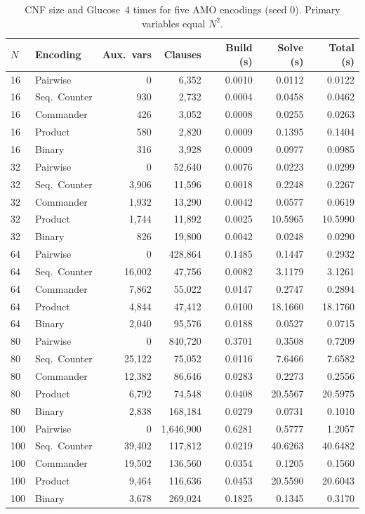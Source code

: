 \documentclass[a4paper,fleqn]{cas-sc}
\begin{document}
\begin{table}[t]
\centering
\caption{CNF size and Glucose~4 times for five AMO encodings (seed 0). Primary variables equal $N^2$.}
\label{tab:enc_data}
\begin{tabular*}{\textwidth}{@{\extracolsep{\fill}}llrrrrr@{}}
\toprule
$N$ & Encoding & Aux.\ vars & Clauses & Build (s) & Solve (s) & Total (s) \\
\midrule
16 & Pairwise & 0 & 6{,}352 & 0.0010 & 0.0112 & 0.0122 \\
16 & Seq.\ Counter & 930 & 2{,}732 & 0.0004 & 0.0458 & 0.0462 \\
16 & Commander & 426 & 3{,}052 & 0.0008 & 0.0255 & 0.0263 \\
16 & Product & 580 & 2{,}820 & 0.0009 & 0.1395 & 0.1404 \\
16 & Binary & 316 & 3{,}928 & 0.0009 & 0.0977 & 0.0985 \\
\midrule
32 & Pairwise & 0 & 52{,}640 & 0.0076 & 0.0223 & 0.0299 \\
32 & Seq.\ Counter & 3{,}906 & 11{,}596 & 0.0018 & 0.2248 & 0.2267 \\
32 & Commander & 1{,}932 & 13{,}290 & 0.0042 & 0.0577 & 0.0619 \\
32 & Product & 1{,}744 & 11{,}892 & 0.0025 & 10.5965 & 10.5990 \\
32 & Binary & 826 & 19{,}800 & 0.0042 & 0.0248 & 0.0290 \\
\midrule
64 & Pairwise & 0 & 428{,}864 & 0.1485 & 0.1447 & 0.2932 \\
64 & Seq.\ Counter & 16{,}002 & 47{,}756 & 0.0082 & 3.1179 & 3.1261 \\
64 & Commander & 7{,}862 & 55{,}022 & 0.0147 & 0.2747 & 0.2894 \\
64 & Product & 4{,}844 & 47{,}412 & 0.0100 & 18.1660 & 18.1760 \\
64 & Binary & 2{,}040 & 95{,}576 & 0.0188 & 0.0527 & 0.0715 \\
\midrule
80 & Pairwise & 0 & 840{,}720 & 0.3701 & 0.3508 & 0.7209 \\
80 & Seq.\ Counter & 25{,}122 & 75{,}052 & 0.0116 & 7.6466 & 7.6582 \\
80 & Commander & 12{,}382 & 86{,}646 & 0.0283 & 0.2273 & 0.2556 \\
80 & Product & 6{,}792 & 74{,}548 & 0.0408 & 20.5567 & 20.5975 \\
80 & Binary & 2{,}838 & 168{,}184 & 0.0279 & 0.0731 & 0.1010 \\
\midrule
100 & Pairwise & 0 & 1{,}646{,}900 & 0.6281 & 0.5777 & 1.2057 \\
100 & Seq.\ Counter & 39{,}402 & 117{,}812 & 0.0219 & 40.6263 & 40.6482 \\
100 & Commander & 19{,}502 & 136{,}560 & 0.0354 & 0.1205 & 0.1560 \\
100 & Product & 9{,}464 & 116{,}636 & 0.0453 & 20.5590 & 20.6043 \\
100 & Binary & 3{,}678 & 269{,}024 & 0.1825 & 0.1345 & 0.3170 \\
\bottomrule
\end{tabular*}
\end{table}
\end{document}
